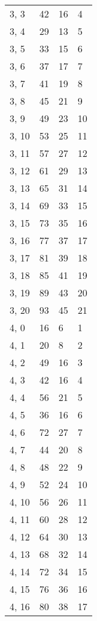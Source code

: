 \begin{table}
\begin{tabular}{llll}
3, 3   &      42 &   16 &     4 \\
3, 4   &      29 &   13 &     5 \\
3, 5   &      33 &   15 &     6 \\
3, 6   &      37 &   17 &     7 \\
3, 7   &      41 &   19 &     8 \\
3, 8   &      45 &   21 &     9 \\
3, 9   &      49 &   23 &    10 \\
3, 10  &      53 &   25 &    11 \\
3, 11  &      57 &   27 &    12 \\
3, 12  &      61 &   29 &    13 \\
3, 13  &      65 &   31 &    14 \\
3, 14  &      69 &   33 &    15 \\
3, 15  &      73 &   35 &    16 \\
3, 16  &      77 &   37 &    17 \\
3, 17  &      81 &   39 &    18 \\
3, 18  &      85 &   41 &    19 \\
3, 19  &      89 &   43 &    20 \\
3, 20  &      93 &   45 &    21 \\
4, 0   &      16 &    6 &     1 \\
4, 1   &      20 &    8 &     2 \\
4, 2   &      49 &   16 &     3 \\
4, 3   &      42 &   16 &     4 \\
4, 4   &      56 &   21 &     5 \\
4, 5   &      36 &   16 &     6 \\
4, 6   &      72 &   27 &     7 \\
4, 7   &      44 &   20 &     8 \\
4, 8   &      48 &   22 &     9 \\
4, 9   &      52 &   24 &    10 \\
4, 10  &      56 &   26 &    11 \\
4, 11  &      60 &   28 &    12 \\
4, 12  &      64 &   30 &    13 \\
4, 13  &      68 &   32 &    14 \\
4, 14  &      72 &   34 &    15 \\
4, 15  &      76 &   36 &    16 \\
4, 16  &      80 &   38 &    17 \\

\end{tabular}
\end{table}
